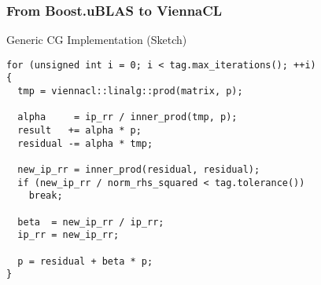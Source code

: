 \begin{frame}[fragile]
\frametitle{From Boost.uBLAS to ViennaCL}
\begin{block}{Generic CG Implementation (Sketch)}
  \begin{lstlisting}
for (unsigned int i = 0; i < tag.max_iterations(); ++i)
{
  tmp = viennacl::linalg::prod(matrix, p);

  alpha     = ip_rr / inner_prod(tmp, p);
  result   += alpha * p;
  residual -= alpha * tmp;
        
  new_ip_rr = inner_prod(residual, residual);
  if (new_ip_rr / norm_rhs_squared < tag.tolerance())
    break;
        
  beta  = new_ip_rr / ip_rr;
  ip_rr = new_ip_rr;

  p = residual + beta * p;
} 
  \end{lstlisting} 
\end{block}

\end{frame}



